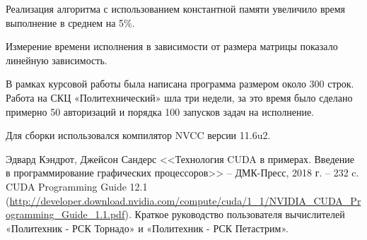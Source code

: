\documentclass[a4paper, final]{article}
\begin{document}
Реализация алгоритма с использованием константной памяти увеличило время выполнение в среднем на 5\%.

Измерение времени исполнения в зависимости от размера матрицы показало линейную
зависимость.

В рамках курсовой работы была написана программа размером около 300 строк. Работа на
СКЦ «Политехнический» шла три недели, за это время было сделано примерно 50 авторизаций и порядка 100 запусков задач на исполнение.

Для сборки использовался компилятор NVCC версии 11.6u2.


\newpage
\begin{thebibliography}{0}
	
 Эдвард Кэндрот, Джейсон Сандерс <<Технология CUDA в примерах. Введение в программирование графических процессоров>> -- ДМК-Пресс, 2018 г. -- 232 c.
         CUDA Programming Guide 12.1 (\url{http://developer.download.nvidia.com/compute/cuda/1_1/NVIDIA_CUDA_Programming_Guide_1.1.pdf}).
         Краткое руководство пользователя вычислителей «Политехник - РСК Торнадо» и «Политехник - РСК Петастрим».
    


\end{thebibliography}
\end{document}
